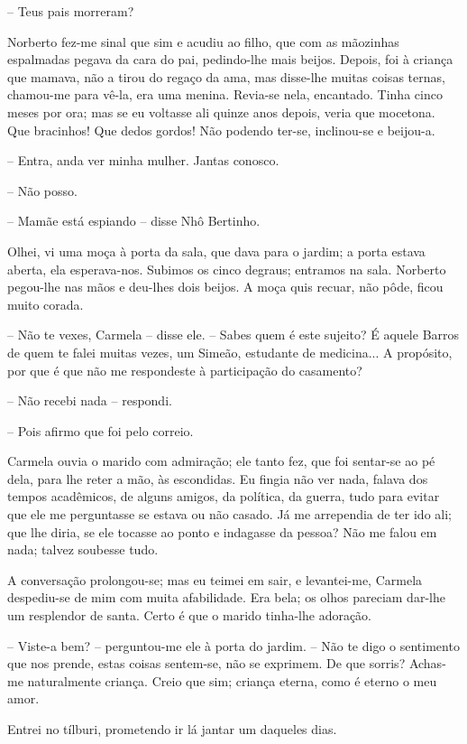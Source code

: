 -- Teus pais morreram?

Norberto fez-me sinal que sim e acudiu ao filho, que com as mãozinhas
espalmadas pegava da cara do pai, pedindo-lhe mais beijos. Depois, foi à
criança que mamava, não a tirou do regaço da ama, mas disse-lhe muitas
coisas ternas, chamou-me para vê-la, era uma menina. Revia-se nela,
encantado. Tinha cinco meses por ora; mas se eu voltasse ali quinze anos
depois, veria que mocetona. Que bracinhos! Que dedos gordos! Não podendo
ter-se, inclinou-se e beijou-a.

-- Entra, anda ver minha mulher. Jantas conosco.

-- Não posso.

-- Mamãe está espiando -- disse Nhô Bertinho.

Olhei, vi uma moça à porta da sala, que dava para o jardim; a porta
estava aberta, ela esperava-nos. Subimos os cinco degraus; entramos na
sala. Norberto pegou-lhe nas mãos e deu-lhes dois beijos. A moça quis
recuar, não pôde, ficou muito corada.

-- Não te vexes, Carmela -- disse ele. -- Sabes quem é este sujeito? É
aquele Barros de quem te falei muitas vezes, um Simeão, estudante de
medicina... A propósito, por que é que não me respondeste à participação
do casamento?

-- Não recebi nada -- respondi.

-- Pois afirmo que foi pelo correio.

Carmela ouvia o marido com admiração; ele tanto fez, que foi sentar-se
ao pé dela, para lhe reter a mão, às escondidas. Eu fingia não ver nada,
falava dos tempos acadêmicos, de alguns amigos, da política, da guerra,
tudo para evitar que ele me perguntasse se estava ou não casado. Já me
arrependia de ter ido ali; que lhe diria, se ele tocasse ao ponto e
indagasse da pessoa? Não me falou em nada; talvez soubesse tudo.

A conversação prolongou-se; mas eu teimei em sair, e levantei-me,
Carmela despediu-se de mim com muita afabilidade. Era bela; os olhos
pareciam dar-lhe um resplendor de santa. Certo é que o marido tinha-lhe
adoração.

-- Viste-a bem? -- perguntou-me ele à porta do jardim. -- Não te digo o
sentimento que nos prende, estas coisas sentem-se, não se exprimem. De
que sorris? Achas-me naturalmente criança. Creio que sim; criança
eterna, como é eterno o meu amor.

Entrei no tílburi, prometendo ir lá jantar um daqueles dias.

